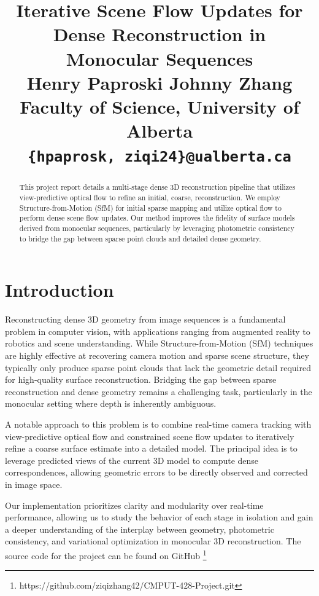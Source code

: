 \documentclass[10pt,twocolumn]{article}
\title{%
    \vspace{-1em}
    \Large\textbf{Iterative Scene Flow Updates for Dense Reconstruction in Monocular Sequences} \\[0.5em]
    \normalsize
    Henry Paproski \quad Johnny Zhang \\[0.3em]
    \small
    Faculty of Science, University of Alberta \\
    \texttt{\{hpaprosk, ziqi24\}@ualberta.ca}
}
\date{}
\begin{document}
\maketitle
\thispagestyle{fancy}

\begin{abstract}
\smallskip
This project report details a multi-stage dense 3D reconstruction pipeline that utilizes view-predictive optical flow to refine an initial, coarse, reconstruction. We employ Structure-from-Motion (SfM) for initial sparse mapping and utilize optical flow to perform dense scene flow updates. Our method improves the fidelity of surface models derived from monocular sequences, particularly by leveraging photometric consistency to bridge the gap between sparse point clouds and detailed dense geometry.
\end{abstract}

\section{Introduction}

Reconstructing dense 3D geometry from image sequences is a fundamental problem in computer vision, with applications ranging from augmented reality to robotics and scene understanding. While Structure-from-Motion (SfM) techniques are highly effective at recovering camera motion and sparse scene structure, they typically only produce sparse point clouds that lack the geometric detail required for high-quality surface reconstruction. Bridging the gap between sparse reconstruction and dense geometry remains a challenging task, particularly in the monocular setting where depth is inherently ambiguous.

A notable approach to this problem is to combine real-time camera tracking with view-predictive optical flow and constrained scene flow updates to iteratively refine a coarse surface estimate into a detailed model. The principal idea is to leverage predicted views of the current 3D model to compute dense correspondences, allowing geometric errors to be directly observed and corrected in image space. 

Our implementation prioritizes clarity and modularity over real-time performance, allowing us to study the behavior of each stage in isolation and gain a deeper understanding of the interplay between geometry, photometric consistency, and variational optimization in monocular 3D reconstruction. The source code for the project can be found on GitHub \footnote{https://github.com/ziqizhang42/CMPUT-428-Project.git}
\end{document}
